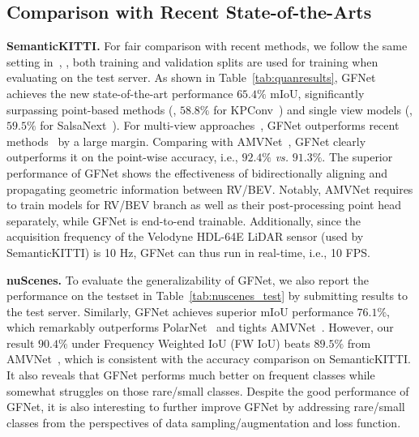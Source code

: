 \subsection{Comparison with Recent State-of-the-Arts}

\textbf{SemanticKITTI.} For fair comparison with recent  methods, we follow the same setting in~\cite{behley2019semantickitti,kochanov2020kprnet}, \ie, both training and validation splits are used for training when evaluating on the test server. As shown in Table~\ref{tab:quanresults}, GFNet achieves the new state-of-the-art performance $65.4\%$ mIoU, significantly surpassing point-based methods (\eg, $58.8\%$ for KPConv~\citep{thomas2019kpconv}) and single view models (\eg, $59.5\%$ for SalsaNext~\citep{cortinhal2020salsanext}). For multi-view approaches~\citep{alnaggar2021multi,chen2020mvlidarnet,gerdzhev2021tornado,liong2020amvnet}, GFNet outperforms recent methods~\cite{alnaggar2021multi,chen2020mvlidarnet,gerdzhev2021tornado} by a large margin. Comparing with AMVNet~\cite{liong2020amvnet}, GFNet clearly outperforms it on the point-wise accuracy, i.e., $92.4\%$ \textit{vs.} $91.3\%$. The superior performance of GFNet shows the effectiveness of bidirectionally aligning and propagating geometric information between RV/BEV.
Notably, AMVNet requires to train models for RV/BEV branch as well as their post-processing point head separately, while GFNet is end-to-end trainable. 
Additionally, since the acquisition frequency of the Velodyne HDL-64E LiDAR sensor (used by SemanticKITTI) is 10 Hz, GFNet can thus run in real-time, i.e., 10 FPS.

\textbf{nuScenes.} To evaluate the generalizability of GFNet, we also report the performance on the testset in Table~\ref{tab:nuscenes_test} by submitting results to the test server. Similarly, GFNet achieves superior mIoU performance $76.1\%$, which remarkably outperforms PolarNet~\citep{zhang2020polarnet} and tights AMVNet~\citep{liong2020amvnet}. However, our result $90.4\%$ under Frequency Weighted IoU (FW IoU) beats $89.5\%$ from AMVNet~\citep{liong2020amvnet}, which is consistent with the accuracy comparison on SemanticKITTI. It also reveals that GFNet performs much better on frequent classes while somewhat struggles on those rare/small classes. Despite the good performance of GFNet, it is also interesting to further improve  GFNet by addressing rare/small classes from the perspectives of data sampling/augmentation and loss function.

